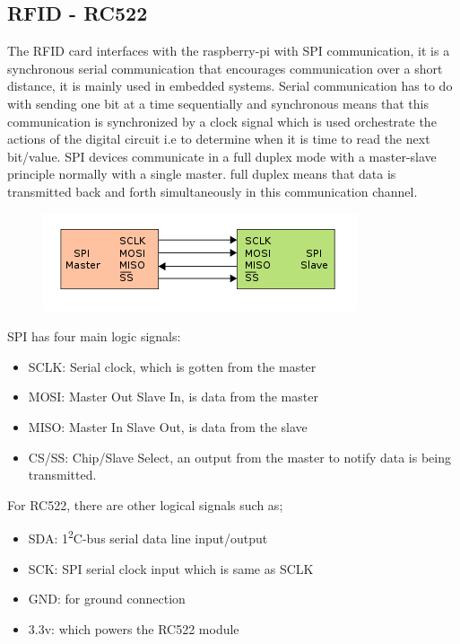 
\subsection{RFID - RC522}
The RFID card interfaces with the raspberry-pi with SPI communication, it is a synchronous serial communication that encourages communication over a short distance, it is mainly used in embedded systems. Serial communication has to do with sending one bit at a time sequentially and synchronous means that this communication is synchronized by a clock signal which is used orchestrate the actions of the digital circuit i.e to determine when it is time to read the next bit/value. SPI devices communicate in a full duplex mode with a master-slave principle normally with a single master. full duplex means that data is transmitted back and forth simultaneously in this communication channel.

\begin{figure}[h]
\includegraphics{Background/images/350px-SPI_single_slave.svg.png.png}
\end{figure}

SPI has four main logic signals: 
\begin{itemize}
  \item SCLK: Serial clock, which is gotten from the master
  \item MOSI: Master Out Slave In, is data from the master
  \item MISO: Master In Slave Out, is data from the slave
  \item CS/SS: Chip/Slave Select, an output from the master to notify data is being transmitted.
\end{itemize}

For RC522, there are other logical signals such as;
\begin{itemize}
  \item SDA: 1\textsuperscript{2}C-bus serial data line input/output 
  \item SCK: SPI serial clock input which is same as SCLK
  \item GND: for ground connection
  \item 3.3v: which powers the RC522 module
\end{itemize}


